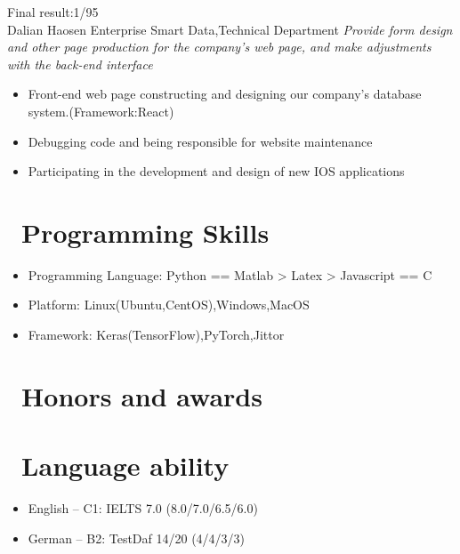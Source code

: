\documentclass{resume}
\begin{document}
	Final result:1/95\\
	 {Dalian Haosen Enterprise Smart Data,Technical Department}
	\textit{Provide form design and other page production for the company's web page, and make adjustments with the back-end interface}
	\begin{itemize}
		\item Front-end web page constructing and designing our company's database system.(Framework:React)
		\item Debugging code and being responsible for website maintenance
		\item Participating in the development and design of new IOS applications
	\end{itemize}
	
	\section{\faCogs\ Programming Skills}
	\begin{itemize}[parsep=0.5ex]
		\item  Programming Language: Python == Matlab > Latex > Javascript == C
		\item Platform: Linux(Ubuntu,CentOS),Windows,MacOS
		\item Framework: Keras(TensorFlow),PyTorch,Jittor
	\end{itemize}
	
	\section{\faHeartO\ Honors and awards}
	
	\section{\faInfo\ Language ability}
	\begin{itemize}[parsep=0.5ex]
		\item English -- C1: IELTS 7.0 (8.0/7.0/6.5/6.0)
		\item German -- B2: TestDaf 14/20 (4/4/3/3)
	\end{itemize}
\end{document}
